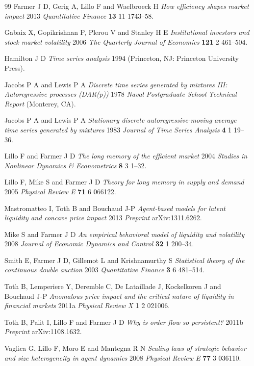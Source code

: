 \documentclass[12pt]{iopart}
\begin{document}
\begin{thebibliography}{99}
 Farmer J D, Gerig A, Lillo F and Waelbroeck H \textit{How efficiency shapes market impact} 2013 \textit{Quantitative Finance} \textbf{13} 11 1743--58.

 Gabaix X, Gopikrishnan P, Plerou V and Stanley H E \textit{Institutional investors and stock market volatility} 2006 \textit{The Quarterly Journal of Economics} \textbf{121} 2 461--504.

 Hamilton J D \textit{Time series analysis} 1994 (Princeton, NJ: Princeton University Press).

 Jacobs P A and Lewis P A \textit{Discrete time series generated by mixtures {III}: Autoregressive processes ({DAR}(p))} 1978 \textit{Naval Postgraduate School Technical Report} (Monterey, CA).

 Jacobs P A and Lewis P A \textit{Stationary discrete autoregressive-moving average time series generated by mixtures} 1983 \textit{Journal of Time Series Analysis} \textbf{4} 1 19--36.

 Lillo F and Farmer J D \textit{The long memory of the efficient market} 2004 \textit{Studies in Nonlinear Dynamics \& Econometrics} \textbf{8} 3 1--32.

 Lillo F, Mike S and Farmer J D \textit{Theory for long memory in supply and demand} 2005 \textit{Physical Review E} \textbf{71} 6 066122.

 Mastromatteo I, Toth B and Bouchaud J-P \textit{Agent-based models for latent liquidity and concave price impact} 2013 \textit{Preprint} arXiv:1311.6262.

 Mike S and Farmer J D \textit{An empirical behavioral model of liquidity and volatility} 2008 \textit{Journal of Economic Dynamics and Control} \textbf{32} 1 200--34.

 Smith E, Farmer J D, Gillemot L and Krishnamurthy S \textit{Statistical theory of the continuous double auction} 2003 \textit{Quantitative Finance} \textbf{3} 6 481--514.

 Toth B, Lemperiere Y, Deremble C, De Lataillade J, Kockelkoren J and Bouchaud J-P \textit{Anomalous price impact and the critical nature of liquidity in financial markets} 2011a \textit{Physical Review X} \textbf{1} 2 021006.

 Toth B, Palit I, Lillo F and Farmer J D \textit{Why is order flow so persistent?} 2011b \textit{Preprint} arXiv:1108.1632.

 Vaglica G, Lillo F, Moro E and Mantegna R N \textit{Scaling laws of strategic behavior and size heterogeneity in agent dynamics} 2008 \textit{Physical Review E} \textbf{77} 3 036110.

\end{thebibliography}
\end{document}

